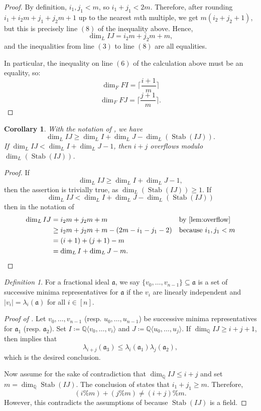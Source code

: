 \documentclass[letterpaper,10pt]{amsart}
\DeclareMathOperator{\Stab}{Stab}
\newcommand{\QQ}{\mathbb{Q}}      %
\newcommand{\mfa}{\mathfrak{a}}
\newtheorem{corollary}[theorem]{Corollary}
\theoremstyle{definition}
\theoremstyle{remark}
\newtheorem{definition}[theorem]{Definition}
\begin{document}
\begin{proof}
By definition, $i_1,j_1 < m$, so $i_1 + j_1 < 2m$. Therefore, after rounding $i_1 + i_2m + j_1 + j_2m + 1$ up to the nearest $m$th multiple, we get $m(i_2 + j_2 + 1)$, but this is precisely line $(8)$ of the inequality above. Hence, 
\[
    \dim_L IJ = i_2m + j_2m + m,
\]
and the inequalities from line $(3)$ to line $(8)$ are all equalities.

In particular, the inequality on line $(6)$ of the calculation above must be an equality, so:
\[
	\dim_F FI = \bigg \lceil \frac{i+1}{m}\bigg \rceil
\]
\[
	\dim_F FJ = \bigg \lceil \frac{j+1}{m}\bigg \rceil.
\]
\end{proof}

\begin{corollary}
\label{cor:zemor-coro}
With the notation of , we have
\[
    \dim_{L}IJ \geq \dim_L I + \dim_L J - \dim_L(\Stab(IJ)).
\]
If $\dim_{L}IJ < \dim_L I + \dim_L J  - 1$, then $i + j$ overflows modulo $\dim_L(\Stab(IJ))$.
\end{corollary}
\begin{proof}
If
\[
    \dim_{L}IJ \geq \dim_L I + \dim_L J - 1,
\]
then the assertion is trivially true, as $\dim_L(\Stab(IJ)) \geq 1$. If 
\[
     \dim_{L}IJ < \dim_L I + \dim_L J - \dim_L(\Stab(IJ))
\]
then in the notation of 
\begin{align*}
\dim_L IJ &= i_2m + j_2m + m && \text{by \Cref{lem:overflow}}\\
&\geq i_2m + j_2m + m - (2m - i_1 - j_1 - 2) && \text{because $i_1,j_1 < m$} \\
&= (i+1) + (j+1) - m && \\
&= \dim_L I + \dim_L J - m.
\end{align*}
\end{proof}

\begin{definition}
For a fractional ideal $\mfa$, we say $\{v_0,\dots,v_{n-1}\} \subseteq \mfa$ is a set of successive minima representatives for $\mfa$ if the $v_i$ are linearly independent and $\lvert v_i \rvert = \lambda_i(\mfa)$ for all $i \in [n]$.
\end{definition}

\begin{proof}[Proof of ]
Let $v_0,\dots,v_{n-1}$ (resp. $u_0,\dots,u_{n-1}$) be successive minima representatives for $\mfa_1$ (resp. $\mfa_2$). Set $I \coloneqq \QQ\langle v_0,\dots,v_i\rangle$ and $J \coloneqq \QQ\langle u_0,\dots,u_j\rangle$. If $\dim_{\QQ}IJ \geq i + j + 1$, then  implies that
\[
    \lambda_{i+j}(\mfa_3) \leq \lambda_i(\mfa_1)\lambda_j(\mfa_2),
\]
which is the desired conclusion. 

Now assume for the sake of contradiction that $\dim_{\QQ}IJ \leq i + j$ and set $m = \dim_{\QQ}\Stab(IJ)$.  The conclusion of  states that $i_1 + j_1 \geq m$. Therefore,   
\[
    (i\%m) + (j\%m) \neq (i + j)\%m.
\]
However, this contradicts the assumptions of  because $\Stab(IJ)$ is a field.
\end{proof}
\end{document}
